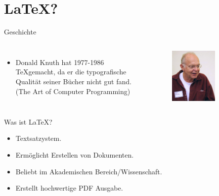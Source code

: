 \section{\LaTeX?}
\begin{frame}{Geschichte}
    \begin{columns}


    \begin{itemize}
        \item Donald Knuth hat 1977-1986 \TeX gemacht, da er die typografische Qualit\"at seiner B\"ucher nicht gut fand. (The Art of Computer Programming)

    \end{itemize}
        
        \hfill
        \begin{figure}[htpb]
            \centering
            \includegraphics[width=0.7\textwidth]{./figs/tex-knuth.jpg}
        \end{figure}
    \end{columns}
\end{frame}

\begin{frame}{Was ist \LaTeX?}
    \begin{itemize}
        \item Textsatzystem.
        \item Erm\"oglicht Erstellen von Dokumenten.
        \item Beliebt im Akademischen Bereich/Wissenschaft.
        \item Erstellt hochwertige PDF Ausgabe.
    \end{itemize}
    
\end{frame}



